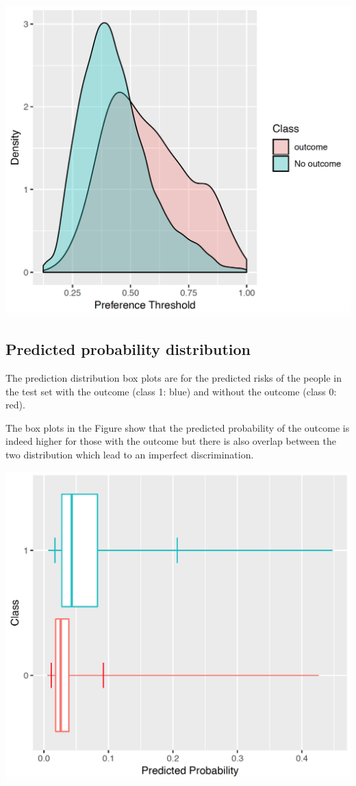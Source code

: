 \documentclass[]{book}
\begin{document}
\includegraphics{images/PatientLevelPrediction/preferencePDF.png}

\newpage

\subsection{Predicted probability
distribution}\label{predicted-probability-distribution}

The prediction distribution box plots are for the predicted risks of the
people in the test set with the outcome (class 1: blue) and without the
outcome (class 0: red).

The box plots in the Figure show that the predicted probability of the
outcome is indeed higher for those with the outcome but there is also
overlap between the two distribution which lead to an imperfect
discrimination.

\includegraphics{images/PatientLevelPrediction/predictionDistribution.png}
\end{document}

